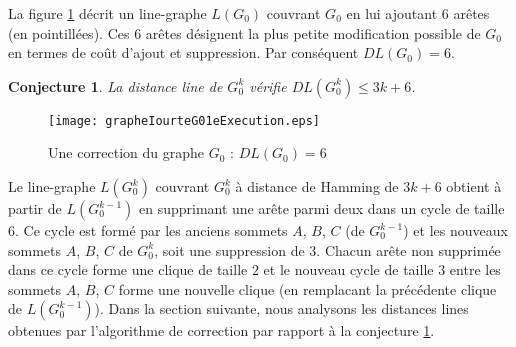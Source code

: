 \documentclass[onecolumn, 12pt]{book}
\newtheorem{conjecture}[theorem]{Conjecture}
\begin{document}
La figure \ref{grapheIourteG01eExecution} d\'ecrit un line-graphe $L(G_0)$ couvrant $G_0$ en lui ajoutant $6$ ar\^etes (en pointill\'ees).
Ces $6$ ar\^etes d\'esignent la plus petite modification possible de $G_0$ en termes de co\^ut d'ajout et suppression.
Par cons\'equent $DL(G_0) = 6$. 
\begin{conjecture}
\label{conjectureDLIourte}
La distance line de $G_0^k$ v\'erifie $DL(G_0^k) \le 3k+6$.
\end{conjecture}
\begin{figure}[htb!] 
\centering
\texttt{[image: grapheIourteG01eExecution.eps]}
\caption{Une correction du graphe $G_0$ : $DL(G_0) = 6$ }
\label{grapheIourteG01eExecution} 
\end{figure}
Le line-graphe  $L(G_0^k)$ couvrant $G_0^k$ \`a distance de Hamming de $3k+6$ obtient \`a partir de  $L(G_0^{k-1})$ en supprimant une ar\^ete parmi deux dans un cycle de taille $6$. Ce cycle est form\'e par les anciens sommets $A$, $B$, $C$ (de $G_0^{k-1}$) et les nouveaux sommets $A$, $B$, $C$ de $G_0^k$, soit une suppression de $3$.
Chacun ar\^ete non supprim\'ee dans ce cycle forme une clique de taille $2$ et  le nouveau cycle de taille $3$ entre les sommets $A$, $B$, $C$ forme une nouvelle clique (en remplacant la pr\'ec\'edente clique de $L(G_0^{k-1})$).
\newline
Dans la section suivante, nous analysons les distances lines obtenues par l'algorithme de correction par rapport \`a la conjecture \ref{conjectureDLIourte}.
\end{document}

